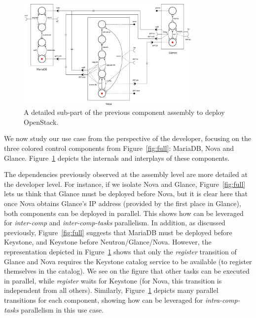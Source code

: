 \begin{figure}[t]
  \begin{center}
    \includegraphics[width=0.8\textwidth]{./images/sub2.pdf}
    \caption{A detailed sub-part of the previous component assembly to deploy
    OpenStack.}
    \label{fig:sub}
  \end{center}
\end{figure}

We now study our use case from the perspective of the developer, focusing on the three colored control components from Figure~\ref{fig:full}: MariaDB, Nova and Glance. Figure~\ref{fig:sub} depicts the internals and interplays of these components.

The dependencies previously observed at the assembly level are more
detailed at the developer level. For instance, if we isolate Nova and Glance,
Figure~\ref{fig:full} lets us think that Glance
must be deployed before Nova, but it is clear here that once Nova obtains
Glance's IP address (provided by the first place in Glance), both
components can be deployed in parallel. This shows how \mad can be
leveraged for \emph{inter-comp} and \emph{inter-comp-tasks}
parallelism. In addition, as discussed previously,
Figure~\ref{fig:full} suggests that MariaDB must be deployed before Keystone,
and Keystone before Neutron/Glance/Nova. However, the \mad
representation depicted in Figure~\ref{fig:sub} shows that
only the \emph{register} transition of Glance and Nova requires the
Keystone catalog service to be available (\ie to register themselves
in the catalog). We see on the figure that other tasks can be
executed in parallel, while \emph{register} waits for Keystone (\eg for
Nova, this transition is independent from all others).
Similarly, Figure~\ref{fig:sub} depicts many
parallel transitions for each component, showing how \mad can be leveraged for
\emph{intra-comp-tasks} parallelism in this use case.

